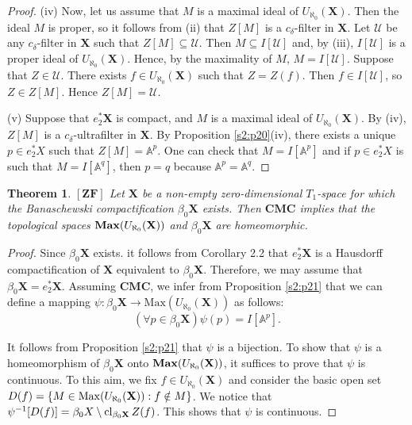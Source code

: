 \documentclass[12pt,twoside,leqno]{article}
\theoremstyle{plain}
\newtheorem{theorem}{Theorem}[section]
\theoremstyle{definition}
\theoremstyle{remark}
\DeclareMathOperator{\cl}{{\rm cl}}
\DeclareMathOperator{\Max}{{\rm Max}}
\DeclareMathOperator{\BMax}{\bf{Max}}
\begin{document}
\begin{proof}
	(iv) Now, let us assume that $M$ is a maximal ideal of $U_{\aleph_0}(\mathbf{X})$. Then the ideal $M$ is proper, so it follows from (ii) that $Z[M]$ is a $c_{\delta}$-filter in $\mathbf{X}$. Let $\mathcal{U}$ be any $c_{\delta}$-filter in $\mathbf{X}$ such that $Z[M]\subseteq \mathcal{U}$. Then $M\subseteq I[\mathcal{U}]$ and, by (iii), $I[\mathcal{U}]$ is a proper ideal of $U_{\aleph_0}(\mathbf{X})$. Hence, by the maximality of $M$, $M=I[\mathcal{U}]$. Suppose that $Z\in\mathcal{U}$. There exists $f\in U_{\aleph_0}(\mathbf{X})$ such that $Z=Z(f)$. Then $f\in I[\mathcal{U}]$, so $Z\in Z[M]$. Hence $Z[M]=\mathcal{U}$.
	
	(v) Suppose that $e_{2}^{\ast}\mathbf{X}$ is compact, and $M$ is a maximal ideal of $U_{\aleph_0}(\mathbf{X})$. By (iv), $Z[M]$ is a $c_{\delta}$-ultrafilter in $\mathbf{X}$. By Proposition \ref{s2:p20}(iv), there exists a unique $p\in e_{2}^{\ast}X$ such that $Z[M]=\mathbb{A}^p$. One can check that $M=I[\mathbb{A}^p]$ and if  $p\in e_{2}^{\ast}X$ is such that $M=I[\mathbb{A}^q]$, then $p=q$ because $\mathbb{A}^p=\mathbb{A}^q$.
\end{proof}

\begin{theorem}
	\label{s2:t22}
	$[\mathbf{ZF}]$ Let $\mathbf{X}$ be a non-empty zero-dimensional $T_1$-space for which the Banaschewski compactification $\beta_0\mathbf{X}$ exists. Then $\mathbf{CMC}$ implies that the topological spaces $\BMax(U_{\aleph_0}(\mathbf{X}))$ and $\beta_0\mathbf{X}$ are homeomorphic. 
\end{theorem}
\begin{proof}
	Since $\beta_0\mathbf{X}$ exists. it follows from Corollary 2.2 that $e_{2}^{\ast}\mathbf{X}$ is a Hausdorff compactification of $\mathbf{X}$ equivalent to $\beta_0\mathbf{X}$. Therefore, we may assume that $\beta_0\mathbf{X}=e_{2}^{\ast}\mathbf{X}$. Assuming $\mathbf{CMC}$, we infer from Proposition \ref{s2:p21} that we can define a mapping $\psi: \beta_0\mathbf{X}\to\text{Max}(U_{\aleph_0}(\mathbf{X}))$ as follows:
	$$(\forall p\in\beta_0\mathbf{X}) \psi(p)=I[\mathbb{A}^p].$$
	
	It follows from Proposition \ref{s2:p21} that $\psi$ is a bijection. To show that $\psi$ is a homeomorphism of $\beta_0\mathbf{X}$ onto $\BMax(U_{\aleph_0}(\mathbf{X}))$, it suffices to prove that $\psi$ is continuous. To this aim, we fix $f\in U_{\aleph_0}(\mathbf{X})$ and consider the basic open set $D(f)=\{M\in\Max(U_{\aleph_0}(\mathbf{X})): f\notin M\}$. We notice that $\psi^{-1}[D(f)]=\beta_0 X\setminus\cl_{\beta_0\mathbf{X}}Z(f)$. This shows that $\psi$ is continuous. 
\end{proof}
\end{document}
